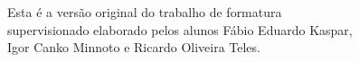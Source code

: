 \documentclass[11pt,oneside,a4paper]{book}
\begin{document}
    \vskip 2cm

    \begin{flushright}
	Esta é a versão original do trabalho de formatura \\ 
    supervisionado elaborado pelos alunos Fábio Eduardo Kaspar,  \\
    Igor Canko Minnoto e Ricardo Oliveira Teles.\\
    \end{flushright}

\pagebreak







\end{document}
